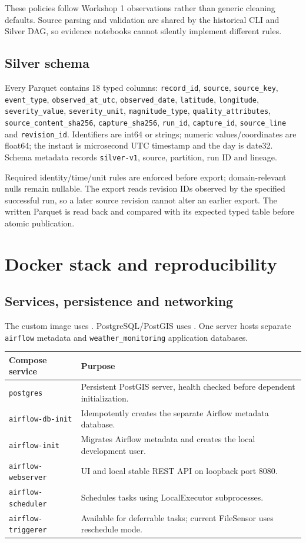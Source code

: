 \documentclass[10pt]{article}
\begin{document}
These policies follow Workshop 1 observations rather than generic cleaning
defaults. Source parsing and validation are shared by the historical CLI and
Silver DAG, so evidence notebooks cannot silently implement different rules.

\subsection{Silver schema}
Every Parquet contains 18 typed columns:
\texttt{record\_id}, \texttt{source}, \texttt{source\_key},
\texttt{event\_type}, \texttt{observed\_at\_utc},
\texttt{observed\_date}, \texttt{latitude}, \texttt{longitude},
\texttt{severity\_value}, \texttt{severity\_unit},
\texttt{magnitude\_type}, \texttt{quality\_attributes},
\texttt{source\_content\_sha256}, \texttt{capture\_sha256},
\texttt{run\_id}, \texttt{capture\_id}, \texttt{source\_line}
and \texttt{revision\_id}.
Identifiers are int64 or strings; numeric values/coordinates are float64;
the instant is microsecond UTC timestamp and the day is date32.
Schema metadata records \texttt{silver-v1}, source, partition, run ID and lineage.

Required identity/time/unit rules are enforced before export; domain-relevant
nulls remain nullable. The export reads revision IDs observed by the specified
successful run, so a later source revision cannot alter an earlier export.
The written Parquet is read back and compared with its expected typed table
before atomic publication.

\section{Docker stack and reproducibility}
\subsection{Services, persistence and networking}
The custom image uses .
PostgreSQL/PostGIS uses .
One server hosts separate \texttt{airflow} metadata and
\texttt{weather\_monitoring} application databases.

\begin{tabularx}{\textwidth}{@{}p{3.4cm}Y@{}}
\toprule
Compose service & Purpose\\
\midrule
\texttt{postgres} & Persistent PostGIS server, health checked before dependent initialization.\\
\texttt{airflow-db-init} & Idempotently creates the separate Airflow metadata database.\\
\texttt{airflow-init} & Migrates Airflow metadata and creates the local development user.\\
\texttt{airflow-webserver} & UI and local stable REST API on loopback port 8080.\\
\texttt{airflow-scheduler} & Schedules tasks using LocalExecutor subprocesses.\\
\texttt{airflow-triggerer} & Available for deferrable tasks; current FileSensor uses reschedule mode.\\
\bottomrule
\end{tabularx}
\end{document}
